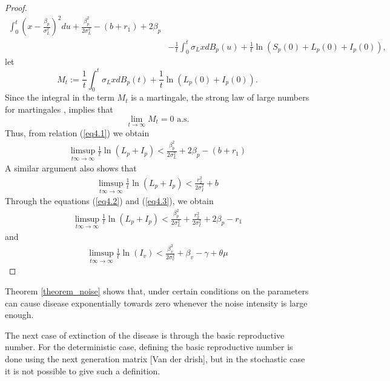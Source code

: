 \begin{proof}
\begin{equation}
\begin{aligned}
					\int_{0}^{t}
					\left(
						x - 
						\frac{\beta_p}{\sigma_L^2}
					\right) ^ 2 du + 
					\frac{\beta_p^2}{2\sigma_L^2} - 
					(b + r_1) + 2\beta_p
				\\
				&-
					\frac{1}{t}
					\int_{0}^{t}
					\sigma_L x dB_p(u) + 
					\frac{1}{t} \ln(S_p(0)+L_p(0)+I_p(0)),
		\end{aligned}
	\end{equation}
	let 
	$$
	M_t :=
		\frac{1}{t}
		\int_{0}^{t}
			\sigma_L x dB_p(t) + 
			\frac{1}{t} \ln(L_p(0)+I_p(0)) .
	$$ 
	Since the integral in the term $M_t$ is a martingale, the strong law of
	large numbers for martingales \cite{Mao}, implies that
	\begin{equation*}
		\lim
		\limits_{t \to \infty} M_t = 0\,\,
		\mbox{a.s.}
	\end{equation*}
	Thus, from relation (\ref{eq4.1}) we obtain
	\begin{align}
		\label{eq4.2}
		\limsup_{t\infty \to \infty}
		\frac{1}{t}
		\ln(L_p + I_p) < 
			\frac{\beta_p^2}{2\sigma_L^2} +
			2\beta_p - (b + r_1)
	\end{align}
	A similar argument also shows that
	\begin{align}\label{eq4.3}
		\limsup_{t\infty \to \infty}
		\frac{1}{t}
		\ln(L_p + I_p) < 
		\frac{r_2 ^ 2}{2 \sigma_I ^ 2} + b
	\end{align}
%
	Through the equations (\ref{eq4.2}) and (\ref{eq4.3}), we obtain
%	
	\begin{align*}
		\limsup_{t\infty \to \infty}
		\frac{1}{t}
		\ln(L_p + I_p) 
			< 
			\frac{\beta_p^2}{2\sigma_L^2} + 
			\frac{r_2^2}{2 \sigma_I ^ 2} +	
			2\beta_p - r_1
	\end{align*}
	and 
	\begin{align*}
		\limsup_{t\infty \to \infty}
		\frac{1}{t}
		\ln(I_v) 
			< 
			\frac{\beta_v^2}{2\sigma_v^2} 
			+ 
			\beta_v - \gamma + \theta \mu
	\end{align*}
\end{proof}
%
\begin{remark}
	Theorem \ref{theorem_noise} shows that, under certain conditions on the 
	parameters can cause disease exponentially towards zero whenever the noise 
	intensity is large enough.
\end{remark}

	The next case of extinction of the disease is through the basic 
reproductive number. For the deterministic case, defining the basic 
reproductive number is done using the next generation matrix [Van der drish], 
but in the stochastic case it is not possible to give such a definition.

